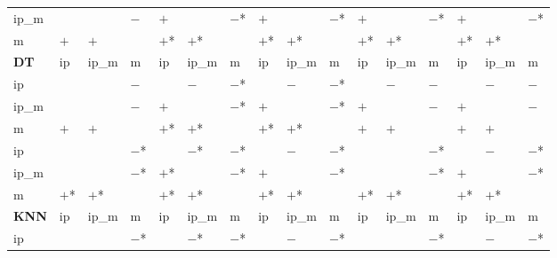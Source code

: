 \begin{table}[htbp]
{\begin{tabular}{l|lll|lll|lll|lll|lll}
ip\_m        &            &            & $-$        & $+$        &            & $-$*       & $+$        &            & $-$*       & $+$        &            & $-$*       & $+$        &            & $-$*        \\
m            & $+$        & $+$        &            & $+$*       & $+$*       &            & $+$*       & $+$*       &            & $+$*       & $+$*       &            & $+$*       & $+$*       &             \\
\hline
\textbf{DT}  & ip         & ip\_m      & m          & ip         & ip\_m      & m          & ip         & ip\_m      & m          & ip         & ip\_m      & m          & ip         & ip\_m      & m           \\
\hline
ip           &            &            & $-$        &            & $-$        & $-$*       &            & $-$        & $-$*       &            & $-$        & $-$        &            & $-$        & $-$         \\
ip\_m        &            &            & $-$        & $+$        &            & $-$*       & $+$        &            & $-$*       & $+$        &            & $-$        & $+$        &            & $-$         \\
m            & $+$        & $+$        &            & $+$*       & $+$*       &            & $+$*       & $+$*       &            & $+$        & $+$        &            & $+$        & $+$        &             \\
\hline
\hline
ip           &            &            & $-$*       &            & $-$*       & $-$*       &            & $-$        & $-$*       &            &            & $-$*       &            & $-$        & $-$*        \\
ip\_m        &            &            & $-$*       & $+$*       &            & $-$*       & $+$        &            & $-$*       &            &            & $-$*       & $+$        &            & $-$*        \\
m            & $+$*       & $+$*       &            & $+$*       & $+$*       &            & $+$*       & $+$*       &            & $+$*       & $+$*       &            & $+$*       & $+$*       &             \\
\hline
\textbf{KNN} & ip         & ip\_m      & m          & ip         & ip\_m      & m          & ip         & ip\_m      & m          & ip         & ip\_m      & m          & ip         & ip\_m      & m           \\
\hline
ip           &            &            & $-$*       &            & $-$*       & $-$*       &            & $-$        & $-$*       &            &            & $-$*       &            & $-$        & $-$*        \\

\end{tabular}}
\end{table}
